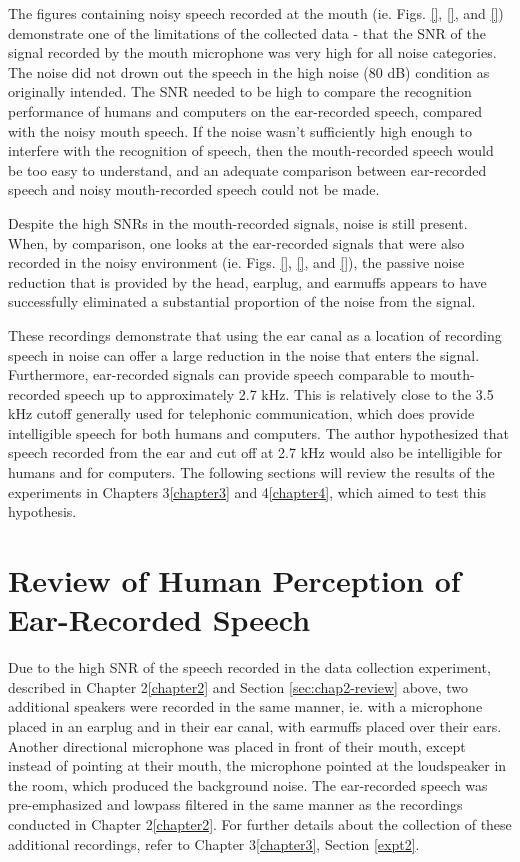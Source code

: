 The figures containing noisy speech recorded at the mouth (ie. Figs. \ref{}, \ref{}, and \ref{}) demonstrate one of the limitations of the collected data - that the SNR of the signal recorded by the mouth microphone was very high for all noise categories.  The noise did not drown out the speech in the high noise (80 dB) condition as originally intended.  The SNR needed to be high to compare the recognition performance of humans and computers on the ear-recorded speech, compared with the noisy mouth speech.  If the noise wasn't sufficiently high enough to interfere with the recognition of speech, then the mouth-recorded speech would be too easy to understand, and an adequate comparison between ear-recorded speech and noisy mouth-recorded speech could not be made.

Despite the high SNRs in the mouth-recorded signals, noise is still present.  When, by comparison, one looks at the ear-recorded signals that were also recorded in the noisy environment (ie. Figs. \ref{}, \ref{}, and \ref{}), the passive noise reduction that is provided by the head, earplug, and earmuffs appears to have successfully eliminated a substantial proportion of the noise from the signal.

These recordings demonstrate that using the ear canal as a location of recording speech in noise can offer a large reduction in the noise that enters the signal.  Furthermore, ear-recorded signals can provide speech comparable to mouth-recorded speech up to approximately 2.7 kHz.  This is relatively close to the 3.5 kHz cutoff generally used for telephonic communication, which does provide intelligible speech for both humans and computers. The author hypothesized that speech recorded from the ear and cut off at 2.7 kHz would also be intelligible for humans and for computers.  The following sections will review the results of the experiments in Chapters 3\ref{chapter3} and 4\ref{chapter4}, which aimed to test this hypothesis.


\section{Review of Human Perception of Ear-Recorded Speech}\label{sec:chap3-review}

Due to the high SNR of the speech recorded in the data collection experiment, described in Chapter 2\ref{chapter2} and Section \ref{sec:chap2-review} above, two additional speakers were recorded in the same manner, ie. with a microphone placed in an earplug and in their ear canal, with earmuffs placed over their ears.  Another directional microphone was placed in front of their mouth, except instead of pointing at their mouth, the microphone pointed at the loudspeaker in the room, which produced the background noise. The ear-recorded speech was pre-emphasized and lowpass filtered in the same manner as the recordings conducted in Chapter 2\ref{chapter2}. For further details about the collection of these additional recordings, refer to Chapter 3\ref{chapter3}, Section \ref{expt2}.

